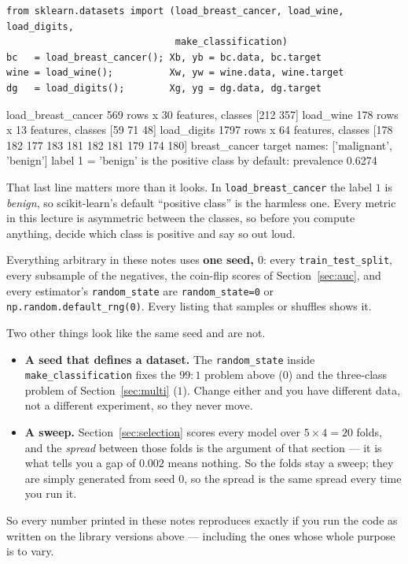 \documentclass[11pt]{article}
\begin{document}
\begin{lstlisting}
from sklearn.datasets import (load_breast_cancer, load_wine, load_digits,
                              make_classification)
bc   = load_breast_cancer(); Xb, yb = bc.data, bc.target
wine = load_wine();          Xw, yw = wine.data, wine.target
dg   = load_digits();        Xg, yg = dg.data, dg.target
\end{lstlisting}
\begin{codeout}
load_breast_cancer  569 rows x 30 features, classes [212 357]
load_wine           178 rows x 13 features, classes [59 71 48]
load_digits        1797 rows x 64 features, classes [178 182 177 183 181 182 181 179 174 180]
breast_cancer target names: ['malignant', 'benign']
label 1 = 'benign' is the positive class by default: prevalence 0.6274
\end{codeout}

That last line matters more than it looks. In \texttt{load\_breast\_cancer} the
label $1$ is \emph{benign}, so scikit-learn's default ``positive class'' is the
harmless one. Every metric in this lecture is asymmetric between the classes,
so before you compute anything, decide which class is positive and say so out
loud.

\begin{keyidea}
Everything arbitrary in these notes uses \textbf{one seed, $0$}: every
\texttt{train\_test\_split}, every subsample of the negatives, the coin-flip
scores of Section~\ref{sec:auc}, and every estimator's \texttt{random\_state}
are \texttt{random\_state=0} or \texttt{np.random.default\_rng(0)}. Every
listing that samples or shuffles shows it.

Two other things look like the same seed and are not.
\begin{itemize}
  \item \textbf{A seed that defines a dataset.} The
    \texttt{random\_state} inside \texttt{make\_classification} fixes the
    $99\!:\!1$ problem above ($0$) and the three-class problem of
    Section~\ref{sec:multi} ($1$). Change either and you have different data,
    not a different experiment, so they never move.
  \item \textbf{A sweep.} Section~\ref{sec:selection} scores every model over
    $5 \times 4 = 20$ folds, and the \emph{spread} between those folds is the
    argument of that section --- it is what tells you a gap of $0.002$ means
    nothing. So the folds stay a sweep; they are simply generated from seed
    $0$, so the spread is the same spread every time you run it.
\end{itemize}

So every number printed in these notes reproduces exactly if you run the code
as written on the library versions above --- including the ones whose whole
purpose is to vary.
\end{keyidea}
\end{document}
